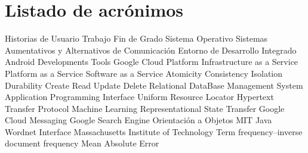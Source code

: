 \chapter{Listado de acrónimos}

{\small
\begin{acronym}[XXXXXXXX]
  		 {Historias de Usuario}	
   	 {Trabajo Fin de Grado}
  		 {Sistema Operativo}
      {Sistemas Aumentativos y Alternativos de Comunicación}
   	 {Entorno de Desarrollo Integrado}
   	 {Android Developments Tools}
   	 {Google Cloud Platform}
      {Infrastructure as a Service}
      {Platform as a Service}
  	 {Software as a Service}
   	 {Atomicity Consistency Isolation Durability}
  	 {Create Read Update Delete}
  	 {Relational DataBase Management System}
       {Application Programming Interface}
   	 {Uniform Resource Locator}
   	 {Hypertext Transfer Protocol}
  		 {Machine Learning}
  	 {Representational State Transfer}
  	 {Google Cloud Messaging}
       {Google Search Engine}
  		 {Orientación a Objetos}
   	 {MIT Java Wordnet Interface}
  	 {Massachusetts Institute of Technology}
  	 {Term frequency–inverse document frequency}
  	 {Mean Absolute Error} 
\end{acronym}
}




